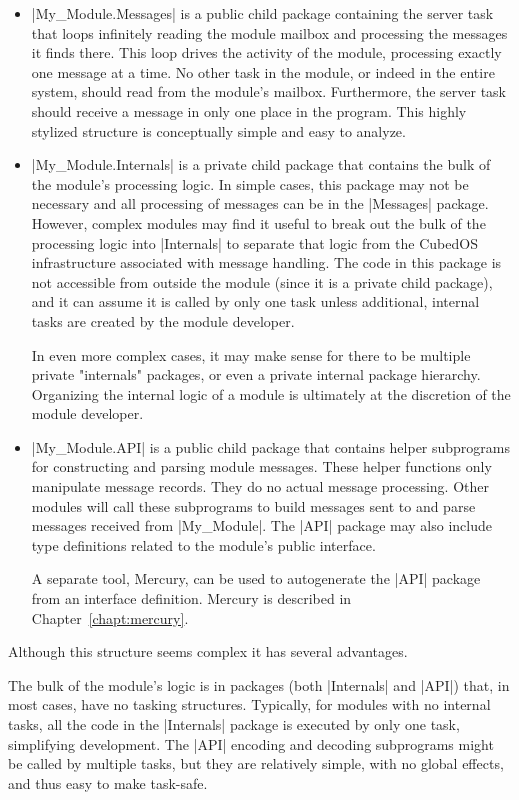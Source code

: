 \begin{itemize}
\item |My_Module.Messages| is a public child package containing the server task that loops
infinitely reading the module mailbox and processing the messages it finds there. This loop
drives the activity of the module, processing exactly one message at a time. No other task in
the module, or indeed in the entire system, should read from the module's mailbox. Furthermore,
the server task should receive a message in only one place in the program. This highly stylized
structure is conceptually simple and easy to analyze.

\item |My_Module.Internals| is a private child package that contains the bulk of the module's
processing logic. In simple cases, this package may not be necessary and all processing of
messages can be in the |Messages| package. However, complex modules may find it useful to break
out the bulk of the processing logic into |Internals| to separate that logic from the CubedOS
infrastructure associated with message handling. The code in this package is not accessible from
outside the module (since it is a private child package), and it can assume it is called by only
one task unless additional, internal tasks are created by the module developer.

In even more complex cases, it may make sense for there to be multiple private "internals"
packages, or even a private internal package hierarchy. Organizing the internal logic of a
module is ultimately at the discretion of the module developer.

\item |My_Module.API| is a public child package that contains helper subprograms for
constructing and parsing module messages. These helper functions only manipulate message
records. They do no actual message processing. Other modules will call these subprograms to
build messages sent to and parse messages received from |My_Module|. The |API| package may also
include type definitions related to the module's public interface.

A separate tool, Mercury, can be used to autogenerate the |API| package from an interface
definition. Mercury is described in Chapter~\ref{chapt:mercury}.
\end{itemize}

Although this structure seems complex it has several advantages.

The bulk of the module's logic is in packages (both |Internals| and |API|) that, in most cases,
have no tasking structures. Typically, for modules with no internal tasks, all the code in the
|Internals| package is executed by only one task, simplifying development. The |API| encoding
and decoding subprograms might be called by multiple tasks, but they are relatively simple, with
no global effects, and thus easy to make task-safe.

